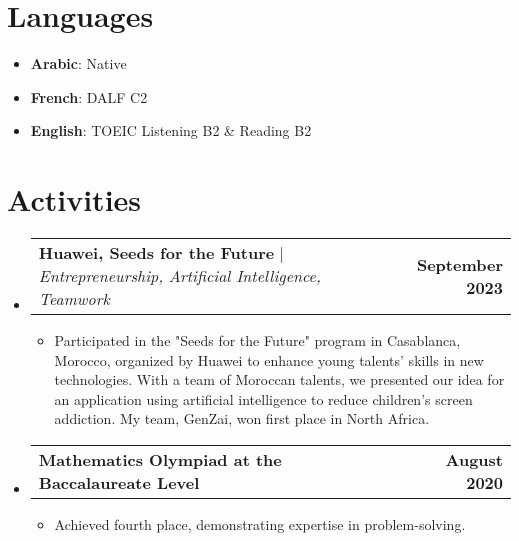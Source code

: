 \documentclass[letterpaper,11pt]{article}
\makeatletter
\newcommand{\resumeItem}[1]{
  \item\small{
    {#1 \vspace{-2pt}}
  }
}
\newcommand{\resumeLanguage}[2]{
  \item\small{
    \textbf{#1}{: #2 \vspace{-2pt}}
  }
}
\newcommand{\resumeProjectHeading}[2]{
    \item
    \begin{tabular*}{1.001\textwidth}{l@{\extracolsep{\fill}}r}
      \small#1 & \textbf{\small #2}\\
    \end{tabular*}\vspace{-7pt}
}
\newcommand{\resumeSubHeadingListStart}{\begin{itemize}[leftmargin=0.0in, label={}]}
\newcommand{\resumeSubHeadingListEnd}{\end{itemize}}
\newcommand{\resumeItemListStart}{\begin{itemize}}
\newcommand{\resumeItemListEnd}{\end{itemize}\vspace{-5pt}}
\makeatother
\begin{document}
\section{Languages}
  \begin{itemize}[left=0in, label={}, itemsep=0.2em, parsep=0pt, topsep=0pt]
    \resumeLanguage{Arabic}{Native}
    \resumeLanguage{French}{DALF C2}
    \resumeLanguage{English}{TOEIC Listening B2 \& Reading B2}
  \end{itemize}

\section{Activities}
    \resumeSubHeadingListStart
        \resumeProjectHeading
          {\textbf{Huawei, Seeds for the Future} $|$ \emph{Entrepreneurship, Artificial Intelligence, Teamwork}}{September 2023}
          \resumeItemListStart
            \resumeItem{Participated in the "Seeds for the Future" program in Casablanca, Morocco, organized by Huawei to enhance young talents' skills in new technologies. With a team of Moroccan talents, we presented our idea for an application using artificial intelligence to reduce children's screen addiction. My team, GenZai, won first place in North Africa.}
          \resumeItemListEnd
          \vspace{-13pt}
        \resumeProjectHeading
          {\textbf{Mathematics Olympiad at the Baccalaureate Level}}{August 2020}
          \resumeItemListStart
            \resumeItem{Achieved fourth place, demonstrating expertise in problem-solving.}
          \resumeItemListEnd
    \resumeSubHeadingListEnd
\end{document}
